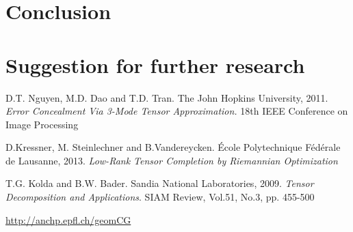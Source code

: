 \documentclass[a4paper, 11pt]{article} %
\begin{document}
\section{Conclusion}
\section{Suggestion for further research}

\begin{thebibliography}{9}

D.T. Nguyen, M.D. Dao and T.D. Tran. {The John Hopkins University}, 2011.
\textit{Error Concealment Via 3-Mode Tensor Approximation.} 18th IEEE Conference on Image Processing


D.Kressner, M. Steinlechner and B.Vandereycken.{ \'Ecole Polytechnique F\'ed\'erale de Lausanne}, 2013. \textit{Low-Rank Tensor Completion by Riemannian Optimization}


  T.G. Kolda and B.W. Bader. {Sandia National Laboratories}, 2009.
\textit{Tensor Decomposition and Applications}. SIAM Review, Vol.51, No.3, pp. 455-500

 \url{http://anchp.epfl.ch/geomCG}
\end{thebibliography}

%
%
%
\end{document}
